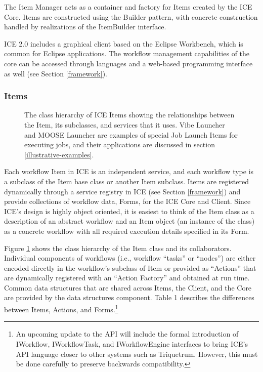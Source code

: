 The Item Manager acts as a container and factory for Items created by the ICE Core. Items are constructed using the Builder pattern, with concrete construction handled by realizations of the ItemBuilder interface. 

ICE 2.0 includes a graphical client based on the Eclipse Workbench, which is common for Eclipse applications. The workflow management capabilities of the core can be accessed through languages and a web-based programming interface as well (see Section \ref{framework}).

\subsubsection{Items}
\label{item}
\label{item-states}

\begin{figure}[htbp]
\centering
{}
\caption{The class hierarchy of ICE Items showing the relationships between the Item, its subclasses, and services that it uses. Vibe Launcher and MOOSE Launcher are examples of special Job Launch Items for executing jobs, and their applications are discussed in section \ref{illustrative-examples}.}
\label{item-arch}
\end{figure}

Each workflow Item in ICE is an independent service, and each
workflow type is a subclass of the Item base class or another Item subclass. Items are registered dynamically
through a service registry in ICE (see Section \ref{framework}) and
provide collections of workflow data, Forms, for the ICE Core and Client. Since ICE's design is
highly object oriented, it is easiest to think of the Item class as a
description of an abstract workflow and an Item object (an instance of
the class) as a concrete workflow with all required execution details
specified in its Form.

Figure \ref{item-arch} shows the class hierarchy of the Item class and its collaborators.
Individual components of workflows (i.e., workflow ``tasks'' or
``nodes'') are either encoded directly in the workflow's subclass of
Item or provided as ``Actions'' that are dynamically registered with
an ``Action Factory'' and obtained at run time. Common data structures that are shared across Items, the Client, and the Core are provided by the data structures component. Table 1 describes the differences between Items, Actions, and Forms.\footnote{An upcoming 
update to the API will include the formal introduction of
IWorkflow, IWorkflowTask, and IWorkflowEngine interfaces to bring ICE's
API language closer to other systems such as Triquetrum. However, this must be done carefully to preserve backwards compatibility.}

